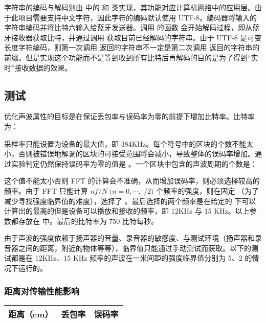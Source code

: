 字符串的编码与解码别由  中的  和  类实现，其功能对应计算机网络中的应用层。由于此项目需要支持中文字符，因此字符的编码默认使用 UTF-8。编码器将输入的字符串编码并将比特六输入给蓝牙发送器。调用  的函数  会开始解码过程，即从蓝牙接收器获取比特，并通过调用  获取目前已经解码的字符串。由于 UTF-8 是可变长度字符编码，则第一次调用  返回的字符串不一定是第二次调用  返回的字符串的前缀。但是实现这个功能而不是等到收到所有比特后再解码的目的是为了得到“实时”接收数据的效果。

\subsection{测试}

优化声波属性的目标是在保证丢包率与误码率为零的前提下增加比特率。比特率为：

\noindent{}

采样率只能设置为设备的最大值，即 384KHz。每个符号中的区块的个数不能太小，否则被错误地解调的区块的可接受范围将会减小，导致整体的误码率增加。通过实验判定仍然保持误码率为零的值是 。一个区块中包含的声波周期的个数是：

\noindent{}

这个值不能太小否则 FFT 的计算会不准确，从而增加误码率，则必须选择较高的频率。由于 FFT 只能计算 $nf/N\;(n=0,\cdots,$  $/2)$ 个频率的强度，则在固定 （为了减少寻找强度临界值的难度），选择了 。最后选择的两个频率是在给定的  下可以计算出的最高的但是设备可以播放和接收的频率，即 12KHz 与 15 KHz。以上参数都存放在  中。最后的比特率为 750 比特每秒。

\newpage

由于声波的强度依赖于扬声器的音量、录音器的敏感度、与测试环境（扬声器和录音器之间的距离，附近的物体等等），临界值只能通过手动测试而获取。以下的测试都是在 12KHz、15 KHz 频率的声波在一米间距的强度临界值分别为 5、2 的情况下运行的。

\subsubsection{距离对传输性能影响}

\begin{table}[h!]
    \centering
    \begin{tabular}{ccc}\toprule
        距离（cm）& 丢包率 & 误码率 \\\midrule
        \bottomrule
    \end{tabular}
\end{table}